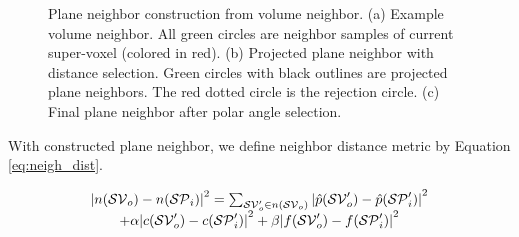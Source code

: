 \begin{figure}[ht!]
	\centering
	\caption{Plane neighbor construction from volume neighbor. (a) Example volume neighbor. All green circles are neighbor samples of current super-voxel (colored in red). (b) Projected plane neighbor with distance selection. Green circles with black outlines are projected plane neighbors. The red dotted circle is the rejection circle. (c) Final plane neighbor after polar angle selection.}
	\label{fig:pln_neigh_constrc}
\end{figure}

With constructed plane neighbor, we define neighbor distance metric by Equation \ref{eq:neigh_dist}.

\begin{equation}\label{eq:neigh_dist}
\begin{matrix}
{\arrowvert n(\mathcal{SV}_o) - n(\mathcal{SP}_i) \arrowvert}^2 = \sum_{\mathcal{SV}_o' \in n(\mathcal{SV}_o)}^{} {\arrowvert \hat{p}(\mathcal{SV}_o') - \hat{p}(\mathcal{SP}_i') \arrowvert}^2  \\
 +\alpha{\arrowvert c(\mathcal{SV}_o') - c(\mathcal{SP}_i') \arrowvert}^2+\beta{\arrowvert f(\mathcal{SV}_o') - f(\mathcal{SP}_i') \arrowvert}^2
\end{matrix}
\end{equation}

